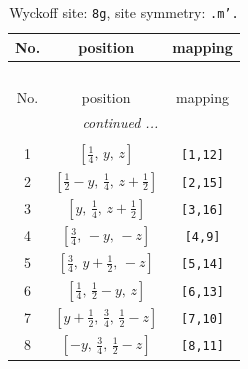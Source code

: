 \documentclass[fleqn,8pt]{jsarticle}
\begin{document}
\begin{longtable}{ccc}
\caption{Wyckoff site: {\tt 8g}, site symmetry: {\tt .m'.}}
 \\
 \hline \hline
No. & position & mapping \\ \hline \endfirsthead

\multicolumn{2}{l}{\tablename\ \thetable{}} \\
 \hline \hline
No. & position & mapping \\ \hline \endhead

 \hline \hline
\multicolumn{2}{r}{\footnotesize\it continued ...} \\ \endfoot

 \hline \hline
\multicolumn{2}{r}{} \\ \endlastfoot

1 & $\left[ \frac{1}{4},\, y,\, z \right]$ & {\tt [1,12]} \\ \hline
2 & $\left[ \frac{1}{2} - y,\, \frac{1}{4},\, z + \frac{1}{2} \right]$ & {\tt [2,15]} \\ \hline
3 & $\left[ y,\, \frac{1}{4},\, z + \frac{1}{2} \right]$ & {\tt [3,16]} \\ \hline
4 & $\left[ \frac{3}{4},\, - y,\, - z \right]$ & {\tt [4,9]} \\ \hline
5 & $\left[ \frac{3}{4},\, y + \frac{1}{2},\, - z \right]$ & {\tt [5,14]} \\ \hline
6 & $\left[ \frac{1}{4},\, \frac{1}{2} - y,\, z \right]$ & {\tt [6,13]} \\ \hline
7 & $\left[ y + \frac{1}{2},\, \frac{3}{4},\, \frac{1}{2} - z \right]$ & {\tt [7,10]} \\ \hline
8 & $\left[ - y,\, \frac{3}{4},\, \frac{1}{2} - z \right]$ & {\tt [8,11]} \\
\end{longtable}
\renewcommand{\arraystretch}{1.2}
\end{document}
